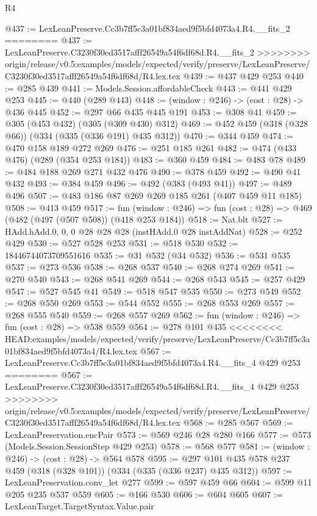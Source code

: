 \begin{lexlean}{R4}
\begin{coremodule}
{{{{{{{{{{{{{{@437 := LexLeanPreserve.Cc3b7ff5c3a01bf834aed9f5bfd4073a4.R4.__fits_2
========
@437 := LexLeanPreserve.C3230f30ed3517afff26549a54f6df68d.R4.__fits_2
>>>>>>>> origin/release/v0.5:examples/models/expected/verify/preserve/LexLeanPreserve/C3230f30ed3517afff26549a54f6df68d/R4.lex.tex
@439 := @437 @429 @253
@440 := @285 @439
@441 := Models.Session.affordableCheck
@443 := @441 @429 @253
@445 := @440 (@289 @443)
@448 := (window : @246) -> (cost : @28) -> @436 @445
@452 := @297 @66 @435 @445 @191
@453 := @308 @41
@459 := @305 (@453 @432) (@305 (@309 @430) @312)
@469 := @452 @459 (@318 (@328 @66)) (@334 (@335 (@336 @191) @435 @312))
@470 := @344 @459
@474 := @470 @158 @189 @272 @269
@476 := @251 @185 @261
@482 := @474 (@433 @476) (@289 (@354 @253 @184))
@483 := @360 @459
@484 := @483 @78
@489 := @484 @188 @269 @271 @432 @476
@490 := @378 @459
@492 := @490 @41 @432
@493 := @384 @459
@496 := @492 (@383 (@493 @41))
@497 := @489 @496
@507 := @483 @186 @87 @269 @269 @185 @261 (@407 @459 @11 @185)
@508 := @413 @459
@517 := fun (window : @246) => fun (cost : @28) => @469 (@482 (@497 (@507 @508)) (@418 @253 @184))
@518 := Nat.blt
@527 := HAdd.hAdd.{0, 0, 0} @28 @28 @28 (instHAdd.{0} @28 instAddNat)
@528 := @252 @429
@530 := @527 @528 @253
@531 := @518 @530
@532 := 18446744073709551616
@535 := @31 @532 (@34 @532)
@536 := @531 @535
@537 := @273 @536
@538 := @268 @537
@540 := @268 @274 @269
@541 := @270 @540
@543 := @268 @541 @269
@544 := @268 @543
@545 := @257 @429
@547 := @527 @545 @41
@549 := @518 @547 @535
@550 := @273 @549
@552 := @268 @550 @269
@553 := @544 @552
@555 := @268 @553 @269
@557 := @268 @555 @540
@559 := @268 @557 @269
@562 := fun (window : @246) => fun (cost : @28) => @538 @559
@564 := @278 @101 @435
<<<<<<<< HEAD:examples/models/expected/verify/preserve/LexLeanPreserve/Cc3b7ff5c3a01bf834aed9f5bfd4073a4/R4.lex.tex
@567 := LexLeanPreserve.Cc3b7ff5c3a01bf834aed9f5bfd4073a4.R4.__fits_4 @429 @253
========
@567 := LexLeanPreserve.C3230f30ed3517afff26549a54f6df68d.R4.__fits_4 @429 @253
>>>>>>>> origin/release/v0.5:examples/models/expected/verify/preserve/LexLeanPreserve/C3230f30ed3517afff26549a54f6df68d/R4.lex.tex
@568 := @285 @567
@569 := LexLeanPreservation.encPair
@573 := @569 @246 @28 @280 @166
@577 := @573 (Models.Session.SessionStep @429 @253)
@578 := @568 @577
@581 := (window : @246) -> (cost : @28) -> @564 @578
@595 := @297 @101 @435 @578 @237 @459 (@318 (@328 @101)) (@334 (@335 (@336 @237) @435 @312))
@597 := LexLeanPreservation.conv_let @277
@599 := @597 @459 @66
@604 := @599 @11 @205 @235 @537 @559
@605 := @166 @530
@606 := @604 @605
@607 := LexLeanTarget.TargetSyntax.Value.pair
}}}}}}}}}}}}}}
\end{coremodule}
\end{lexlean}
